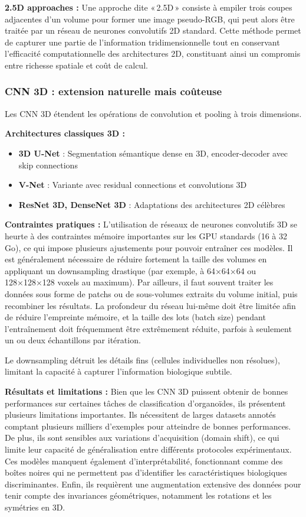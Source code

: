 \textbf{2.5D approaches :}
Une approche dite « 2.5D » consiste à empiler trois coupes adjacentes d’un volume pour former une image pseudo-RGB, qui peut alors être traitée par un réseau de neurones convolutifs 2D standard. Cette méthode permet de capturer une partie de l’information tridimensionnelle tout en conservant l’efficacité computationnelle des architectures 2D, constituant ainsi un compromis entre richesse spatiale et coût de calcul.

\subsubsection{CNN 3D : extension naturelle mais coûteuse}

Les CNN 3D étendent les opérations de convolution et pooling à trois dimensions.

\textbf{Architectures classiques 3D :}
\begin{itemize}
    \item \textbf{3D U-Net} : Segmentation sémantique dense en 3D, encoder-decoder avec skip connections
    \item \textbf{V-Net} : Variante avec residual connections et convolutions 3D
    \item \textbf{ResNet 3D, DenseNet 3D} : Adaptations des architectures 2D célèbres
\end{itemize}

\textbf{Contraintes pratiques :}
L’utilisation de réseaux de neurones convolutifs 3D se heurte à des contraintes mémoire importantes sur les GPU standards (16 à 32 Go), ce qui impose plusieurs ajustements pour pouvoir entraîner ces modèles. Il est généralement nécessaire de réduire fortement la taille des volumes en appliquant un downsampling drastique (par exemple, à 64×64×64 ou 128×128×128 voxels au maximum). Par ailleurs, il faut souvent traiter les données sous forme de patchs ou de sous-volumes extraits du volume initial, puis recombiner les résultats. La profondeur du réseau lui-même doit être limitée afin de réduire l’empreinte mémoire, et la taille des lots (batch size) pendant l’entraînement doit fréquemment être extrêmement réduite, parfois à seulement un ou deux échantillons par itération.

Le downsampling détruit les détails fins (cellules individuelles non résolues), limitant la capacité à capturer l'information biologique subtile.

\textbf{Résultats et limitations :}
Bien que les CNN 3D puissent obtenir de bonnes performances sur certaines tâches de classification d'organoïdes, ils présentent plusieurs limitations importantes. Ils nécessitent de larges datasets annotés comptant plusieurs milliers d'exemples pour atteindre de bonnes performances. De plus, ils sont sensibles aux variations d'acquisition (domain shift), ce qui limite leur capacité de généralisation entre différents protocoles expérimentaux. Ces modèles manquent également d'interprétabilité, fonctionnant comme des boîtes noires qui ne permettent pas d'identifier les caractéristiques biologiques discriminantes. Enfin, ils requièrent une augmentation extensive des données pour tenir compte des invariances géométriques, notamment les rotations et les symétries en 3D.

